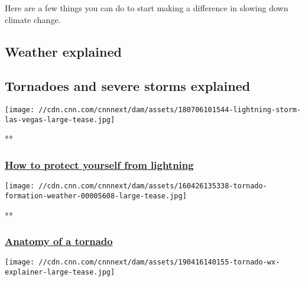 Here are a few things you can do to start making a difference in slowing
down climate change.

\hypertarget{weather-explained-}{%
\subsection{Weather explained~}\label{weather-explained-}}

\hypertarget{tornadoes-and-severe-storms-explained}{%
\subsection{Tornadoes and severe storms
explained}\label{tornadoes-and-severe-storms-explained}}

\href{/videos/weather/2018/07/06/lightning-thunderstorm-safety-jennifer-gray-orig-ec-mss.cnn}{}

\texttt{[image: //cdn.cnn.com/cnnnext/dam/assets/180706101544-lightning-storm-las-vegas-large-tease.jpg]}

**

\hypertarget{how-to-protect-yourself-from-lightning}{%
\subsubsection{\texorpdfstring{\href{/videos/weather/2018/07/06/lightning-thunderstorm-safety-jennifer-gray-orig-ec-mss.cnn}{How
to protect yourself from
lightning}}{How to protect yourself from lightning}}\label{how-to-protect-yourself-from-lightning}}

\href{/videos/us/2016/04/26/tornado-formation-weather.cnn}{}

\texttt{[image: //cdn.cnn.com/cnnnext/dam/assets/160426135338-tornado-formation-weather-00005608-large-tease.jpg]}

**

\hypertarget{anatomy-of-a-tornado-}{%
\subsubsection{\texorpdfstring{\href{/videos/us/2016/04/26/tornado-formation-weather.cnn}{Anatomy
of a tornado }}{Anatomy of a tornado }}\label{anatomy-of-a-tornado-}}

\href{/videos/weather/2019/04/16/how-to-prepare-for-severe-weather-tornado-wx-orig-llr.cnn}{}

\texttt{[image: //cdn.cnn.com/cnnnext/dam/assets/190416140155-tornado-wx-explainer-large-tease.jpg]}

